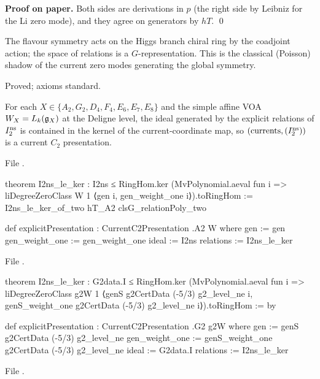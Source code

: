 \textbf{Proof on paper.} Both sides are derivations in $p$ (the right side by Leibniz for the Li zero mode),
and they agree on generators by $hT$. \qed

\begin{physics}
The flavour symmetry acts on the Higgs branch chiral ring by the coadjoint action; the space of relations
is a $G$-representation. This is the classical (Poisson) shadow of the current zero modes generating the
global symmetry.
\end{physics}

\begin{status}
Proved; axioms standard.
\end{status}

\begin{theorem}\label{l24:thm:sevenpres}
For each $X\in\{A_2,G_2,D_4,F_4,E_6,E_7,E_8\}$ and the simple affine VOA $W_X=L_k(\mathfrak g_X)$ at the Deligne
level, the ideal generated by the explicit relations of $I_2^{\mathrm{ns}}$ is contained in the kernel of the
current-coordinate map, so $(\mathrm{currents},(I_2^{\mathrm{ns}}))$ is a current $C_2$ presentation.
\end{theorem}
\noindent File .
\begin{leancode}
theorem I2ns_le_ker : I2ns ≤ RingHom.ker
    (MvPolynomial.aeval fun i =>
      liDegreeZeroClass W 1 ⟨gen i, gen_weight_one i⟩).toRingHom :=
  I2ns_le_ker_of_two hT_A2 clsG_relationPoly_two

def explicitPresentation : CurrentC2Presentation .A2 W where
  gen := gen
  gen_weight_one := gen_weight_one
  ideal := I2ns
  relations := I2ns_le_ker
\end{leancode}
\noindent File .
\begin{leancode}
theorem I2ns_le_ker : G2data.I ≤ RingHom.ker
    (MvPolynomial.aeval fun i =>
      liDegreeZeroClass g2W 1 ⟨genS g2CertData (-5/3) g2_level_ne i,
        genS_weight_one g2CertData (-5/3) g2_level_ne i⟩).toRingHom := by

def explicitPresentation : CurrentC2Presentation .G2 g2W where
  gen := genS g2CertData (-5/3) g2_level_ne
  gen_weight_one := genS_weight_one g2CertData (-5/3) g2_level_ne
  ideal := G2data.I
  relations := I2ns_le_ker
\end{leancode}
\noindent File .
